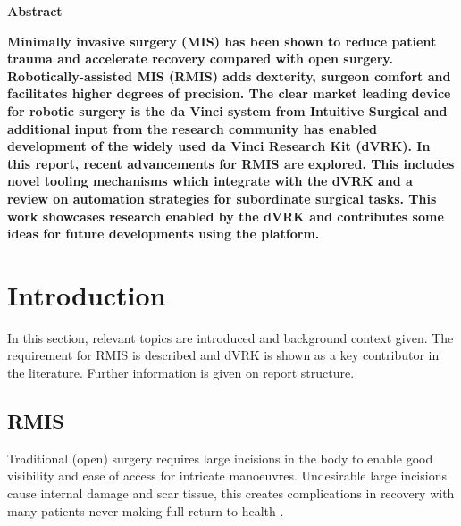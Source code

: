 \documentclass[english]{sobraep}
\begin{document}
\setcounter{page}{1}
\thispagestyle{plain}
\begin{center}
    
    \textbf{Abstract}
\end{center}
\textbf{Minimally invasive surgery (MIS) has been shown to reduce patient trauma and accelerate recovery compared with open surgery. Robotically-assisted MIS (RMIS) adds dexterity, surgeon comfort and facilitates higher degrees of precision. The clear market leading device for robotic surgery is the da Vinci system from Intuitive Surgical and additional input from the research community has enabled development of the widely used da Vinci Research Kit (dVRK). In this report, recent advancements for RMIS are explored. This includes novel tooling mechanisms which integrate with the dVRK and a review on automation strategies for subordinate surgical tasks. This work showcases research enabled by the dVRK and contributes some ideas for future developments using the platform.}

\section{Introduction}
\par{In this section, relevant topics are introduced and background context given. The requirement for RMIS is described and dVRK is shown as a key contributor in the literature. Further information is given on report structure. }


\subsection{RMIS}
\par{Traditional (open) surgery requires large incisions in the body to enable good visibility and ease of access for intricate manoeuvres. Undesirable large incisions cause internal damage and scar tissue, this creates complications in recovery with many patients never making full return to health \cite{Nezhat2021}.}
\end{document}
